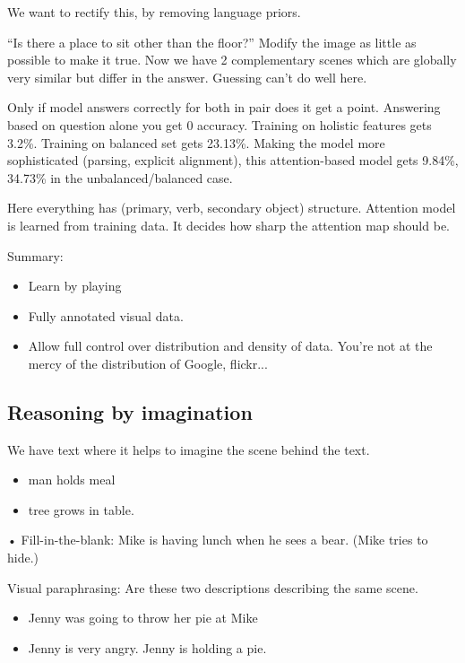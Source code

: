 We want to rectify this, by removing language priors. 

``Is there a place to sit other than the floor?'' Modify the image as little as possible to make it true. Now we have 2 complementary scenes which are globally very similar but differ in the answer. Guessing can't do well here.

Only if model answers correctly for both in pair does it get a point. Answering based on question alone you get 0 accuracy. Training on holistic features gets 3.2\%. Training on balanced set gets 23.13\%. Making the model more sophisticated (parsing, explicit alignment), this attention-based model gets 9.84\%, 34.73\% in the unbalanced/balanced case.

Here everything has (primary, verb, secondary object) structure. Attention model is learned from training data.  It decides how sharp the attention map should be. %


Summary:
\begin{itemize}
\item
Learn by playing
\item
Fully annotated visual data.
\item
Allow full control over distribution and density of data. You're not at the mercy of the distribution of Google, flickr...
\end{itemize}

\subsection{Reasoning by imagination}%

We have text where it helps to imagine the scene behind the text. %
\begin{itemize}
\item
man holds meal
\item
tree grows in table.
\end{itemize}•
Fill-in-the-blank: Mike is having lunch when he sees a bear. (Mike tries to hide.)

Visual paraphrasing: Are these two descriptions describing the same scene. 
\begin{itemize}
\item
Jenny was going to throw her pie at Mike
\item
Jenny is very angry. Jenny is holding a pie.
\end{itemize}

